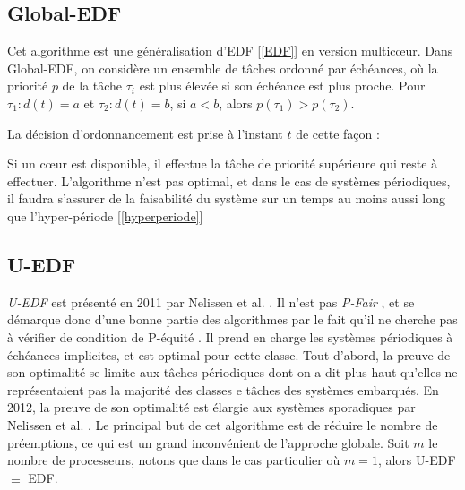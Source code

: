 	\subsection{Global-EDF}\label{GlobalEDF}
	Cet algorithme est une généralisation d'EDF [\ref*{EDF}] en version multicœur. Dans Global-EDF, on 
	considère un ensemble de tâches ordonné par échéances, 
	où la priorité $p$ de la tâche $\tau_{i}$ est plus élevée si son échéance est plus proche.
	Pour $\tau_{1} : d(t) = a$ et $\tau_{2} : d(t) = b$, si $a < b$, alors $p(\tau_1) > p(\tau_2)$.\newline
	
	La décision d'ordonnancement est prise à l'instant $t$ de cette façon :
	
	Si un cœur est disponible, il effectue la tâche de priorité supérieure qui reste à effectuer.
	L'algorithme n'est pas optimal, et dans le cas de systèmes périodiques, 
	il faudra s'assurer de la faisabilité du système sur un temps au moins aussi long que 
	l'hyper-période [\ref*{hyperperiode}]
	
	
	\subsection{U-EDF}
	\textit{U-EDF} est présenté en 2011 par Nelissen et al. \cite{nelissen_reducing_2011}. Il n'est pas \og \textit{P-Fair}\fg{} , et se démarque donc d'une bonne partie des algorithmes 
	par le fait qu'il ne cherche pas à vérifier de condition de \og P-équité\fg{} .
	Il prend en charge les systèmes périodiques à échéances implicites, et est optimal pour cette classe. 
	Tout d'abord, la preuve de son optimalité se limite aux tâches périodiques dont on a dit plus haut qu'elles 
	ne représentaient pas la majorité des classes e tâches des systèmes embarqués. 
	En 2012, la preuve de son optimalité est élargie aux systèmes sporadiques par Nelissen et al. \cite{nelissen_u-edf_2012}. Le principal but de cet algorithme est de 
	réduire le nombre de préemptions, ce qui est un grand inconvénient de l'approche globale. 
	Soit $m$ le nombre de processeurs, notons que dans le cas particulier où $m = 1$, alors 
	U-EDF $\equiv$ EDF. 
	
